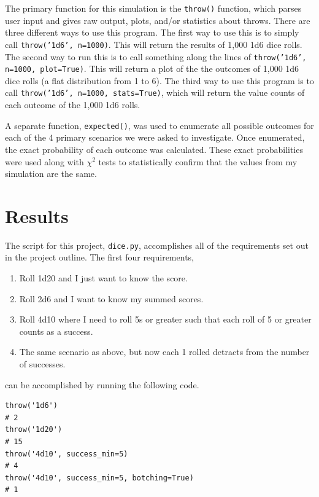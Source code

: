 \documentclass[twocolumn,letterpaper]{article}  %
\begin{document}
The primary function for this simulation is the \texttt{throw()} function, which parses user input and gives raw output, plots, and/or statistics about throws. There are three different ways to use this program. The first way to use this is to simply call \texttt{throw('1d6', n=1000)}. This will return the results of 1,000 1d6 dice rolls. The second way to run this is to call something along the lines of \texttt{throw('1d6', n=1000, plot=True)}. This will return a plot of the the outcomes of 1,000 1d6 dice rolls (a flat distribution from 1 to 6). The third way to use this program is to call \texttt{throw('1d6', n=1000, stats=True)}, which will return the value counts of each outcome of the 1,000 1d6 rolls.

A separate function, \texttt{expected()}, was used to enumerate all possible outcomes for each of the 4 primary scenarios we were asked to investigate. Once enumerated, the exact probability of each outcome was calculated. These exact probabilities were used along with $\chi^2$ tests to statistically confirm that the values from my simulation are the same.

\section{Results}

The script for this project, \texttt{dice.py}, accomplishes all of the requirements set out in the project outline. The first four requirements,

\begin{enumerate}
\itemsep-.25em
\item Roll 1d20 and I just want to know the score.
\item Roll 2d6 and I want to know my summed scores.
\item Roll 4d10 where I need to roll 5s or greater such that each roll of 5 or greater counts as a success.
\item The same scenario as above, but now each 1 rolled detracts from the number of successes.
\end{enumerate}

can be accomplished by running the following code.

\begin{lstlisting}
throw('1d6')
# 2
throw('1d20')
# 15
throw('4d10', success_min=5)
# 4
throw('4d10', success_min=5, botching=True)
# 1
\end{lstlisting}
\end{document}
